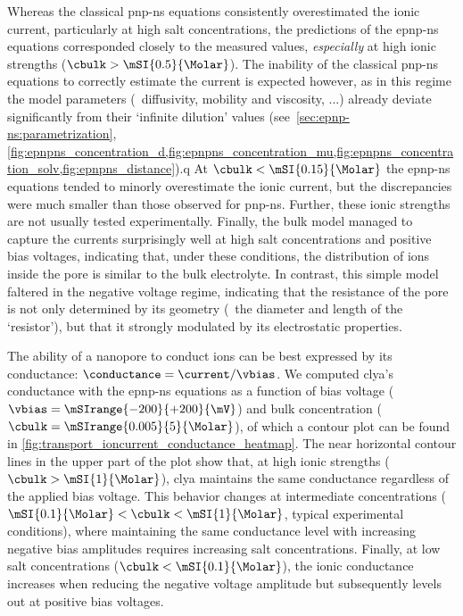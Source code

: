 Whereas the classical \gls{pnp-ns} equations consistently overestimated the ionic current, particularly at
high salt concentrations, the predictions of the \gls{epnp-ns} equations corresponded closely to the measured
values, \emph{especially} at high ionic strengths ($\cbulk > \mSI{0.5}{\Molar}$). The inability of the
classical \gls{pnp-ns} equations to correctly estimate the current is expected however, as in this regime the
model parameters (\eg~diffusivity, mobility and viscosity, ...) already deviate significantly from their
`infinite dilution' values (see~\cref{sec:epnp-ns:parametrization},
\cref{fig:epnpns_concentration_d,fig:epnpns_concentration_mu,fig:epnpns_concentration_solv,fig:epnpns_distance}).q
At $\cbulk < \mSI{0.15}{\Molar}$ the \gls{epnp-ns} equations tended to minorly overestimate the ionic current,
but the discrepancies were much smaller than those observed for \gls{pnp-ns}. Further, these ionic strengths
are not usually tested experimentally. Finally, the bulk model managed to capture the currents surprisingly
well at high salt concentrations and positive bias voltages, indicating that, under these conditions, the
distribution of ions inside the pore is similar to the bulk electrolyte. In contrast, this simple model
faltered in the negative voltage regime, indicating that the resistance of the pore is not only determined by
its geometry (\ie~the diameter and length of the `resistor'), but that it strongly modulated by its
electrostatic properties.

The ability of a nanopore to conduct ions can be best expressed by its conductance: $\conductance = \current /
\vbias$. We computed \gls{clya}'s conductance with the \gls{epnp-ns} equations as a function of bias voltage
($\vbias = \mSIrange{-200}{+200}{\mV}$) and bulk  concentration ($\cbulk =
\mSIrange{0.005}{5}{\Molar}$), of which a contour plot can be found in
\cref{fig:transport_ioncurrent_conductance_heatmap}. The near horizontal contour lines in the upper part of
the plot show that, at high ionic strengths ($\cbulk > \mSI{1}{\Molar}$), \gls{clya} maintains the same
conductance regardless of the applied bias voltage. This behavior changes at intermediate concentrations
($\mSI{0.1}{\Molar} < \cbulk < \mSI{1}{\Molar}$, typical experimental conditions), where maintaining the same
conductance level with increasing negative bias amplitudes requires increasing salt concentrations. Finally,
at low salt concentrations ($\cbulk < \mSI{0.1}{\Molar}$), the ionic conductance increases when reducing the
negative voltage amplitude but subsequently levels out at positive bias voltages.

